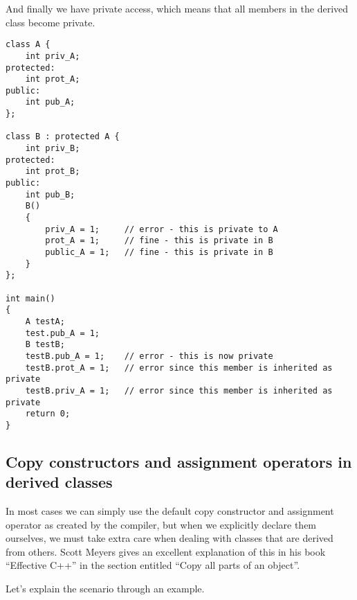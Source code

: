 And finally we have private access, which means that all members in the derived class become private. 
\begin{lstlisting}
class A {
	int priv_A;
protected:
	int prot_A;
public:
	int pub_A;
};

class B : protected A {
	int priv_B;
protected:
	int prot_B;
public:
	int pub_B;
	B() 
	{
		priv_A = 1; 	// error - this is private to A
		prot_A = 1; 	// fine - this is private in B
		public_A = 1; 	// fine - this is private in B
	}
};

int main()
{
	A testA;
	test.pub_A = 1;
	B testB;
	testB.pub_A = 1; 	// error - this is now private
	testB.prot_A = 1;	// error since this member is inherited as private
	testB.priv_A = 1;	// error since this member is inherited as private
	return 0;
}	
\end{lstlisting}

\subsection{Copy constructors and assignment operators in derived classes}
\label{sec:copy-constr-assignm}

In most cases we can simply use the default copy constructor and
assignment operator as created by the compiler, but when we explicitly
declare them ourselves, we must take extra care when dealing with
classes that are derived from others. Scott Meyers gives an excellent
explanation of this in his book ``Effective C++'' in the section
entitled ``Copy all parts of an object''.

Let's explain the scenario through an example.

